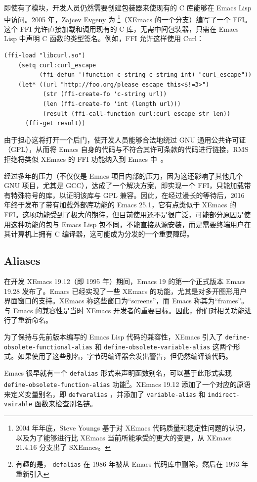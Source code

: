 \documentclass[format=acmsmall,screen]{acmart}
\begin{document}
即使有了模块，开发人员仍然需要创建包装器来使现有的 C 库能够在 Emacs Lisp 中访问。2005 年，Zajcev Evgeny 为 \citet{SXEmacs}\footnote{2004 年年底，Steve Youngs 基于对 XEmacs 代码质量和稳定性问题的认识，以及为了能够进行比 XEmacs 当前所能承受的更大的变更，从 XEmacs 21.4.16 分支出了 SXEmacs。}（XEmacs 的一个分支）编写了一个 FFI。这个 FFI 允许直接加载和调用现有的 C 库，无需中间包装器，只需在 Emacs Lisp 中声明 C 函数的类型签名。例如，FFI 允许这样使用 Curl：

\begin{Verbatim}[samepage=true]
    (ffi-load "libcurl.so")
    (setq curl:curl_escape
          (ffi-defun '(function c-string c-string int) "curl_escape"))
    (let* ((url "http://foo.org/please escape this<$!=3>")
           (str (ffi-create-fo 'c-string url))
           (len (ffi-create-fo 'int (length url)))
           (result (ffi-call-function curl:curl_escape str len))
      (ffi-get result))
\end{Verbatim}
由于担心这将打开一个后门，使开发人员能够合法地绕过 GNU 通用公共许可证（GPL），从而将 Emacs 自身的代码与不符合其许可条款的代码进行链接，RMS 拒绝将类似 XEmacs 的 FFI 功能纳入到 Emacs 中~\cite{RMS03}。

经过多年的压力（不仅仅是 Emacs 项目内部的压力，因为这还影响了其他几个 GNU 项目，尤其是 GCC），达成了一个解决方案，即实现一个 FFI，只能加载带有特殊符号的库，以证明该库与 GPL 兼容。因此，在经过漫长的等待后，2016 年终于发布了带有加载外部库功能的 Emacs 25.1，它有点类似于 XEmacs 的 FFI。这项功能受到了极大的期待，但目前使用还不是很广泛，可能部分原因是使用这种功能的包与 Emacs Lisp 包不同，不能直接从源安装，而是需要终端用户在其计算机上拥有 C 编译器，这可能成为分发的一个重要障碍。

\subsection{Aliases}

在开发 XEmacs 19.12（即 1995 年）期间，Emacs 19 的第一个正式版本 Emacs 19.28 发布了。Emacs 已经实现了一些 XEmacs 的功能，尤其是对多开图形用户界面窗口的支持。XEmacs 称这些窗口为“screens”，而 Emacs 称其为“frames”。与 Emacs 的兼容性是当时 XEmacs 开发者的重要目标。因此，他们对相关功能进行了重新命名。

为了保持与先前版本编写的 Emacs Lisp 代码的兼容性，XEmacs 引入了 \texttt{define-obsolete-functional-alias} 和 \texttt{define-obsolete-variable-alias} 这两个形式。如果使用了这些别名，字节码编译器会发出警告，但仍然编译该代码。

Emacs 很早就有一个 \texttt{defalias} 形式来声明函数别名，可以基于此形式实现 \texttt{define-obsolete-function-alias} 功能\footnote{有趣的是， \texttt{defalias} 在 1986 年被从 Emacs 代码库中删除，然后在 1993 年重新引入}。XEmacs 19.12 添加了一个对应的原语来定义变量别名，即 \texttt{defvaralias} ，并添加了 \texttt{variable-alias} 和 \texttt{indirect-vairable} 函数来检查别名链。
\end{document}
